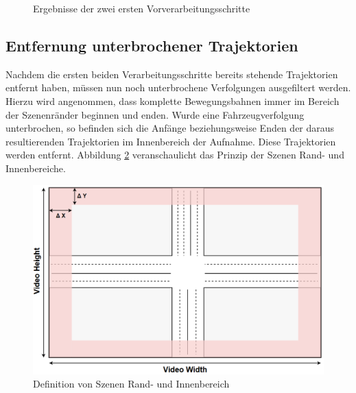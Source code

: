 \begin{figure}[H]
    \centering
    \qquad \qquad
    \caption{Ergebnisse der zwei ersten Vorverarbeitungsschritte}
    \label{fig:real_result_2nd_Prepro}
\end{figure}


\subsection{Entfernung unterbrochener Trajektorien}

Nachdem die ersten beiden Verarbeitungsschritte bereits stehende Trajektorien entfernt haben,
müssen nun noch unterbrochene Verfolgungen ausgefiltert werden. Hierzu wird angenommen, dass komplette
Bewegungsbahnen immer im Bereich der Szenenränder beginnen und enden. Wurde eine Fahrzeugverfolgung
unterbrochen, so befinden sich die Anfänge beziehungsweise Enden der daraus resultierenden Trajektorien
im Innenbereich der Aufnahme. Diese Trajektorien werden entfernt. Abbildung \ref{fig:real_completeTrajectory_Definition}
veranschaulicht das Prinzip der Szenen Rand- und Innenbereiche.

\begin{figure}[H]
\centering
    \includegraphics[width=0.5\linewidth]{resources/img/umsetzung/U1/LaneTopo_CompleteTra}
\caption{Definition von Szenen Rand- und Innenbereich}
\label{fig:real_completeTrajectory_Definition}
\end{figure}

